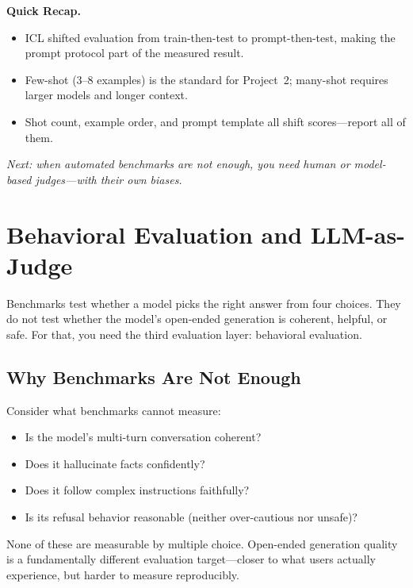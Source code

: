 \begin{quickrecap}
\textbf{Quick Recap.}
\begin{itemize}[nosep,leftmargin=1.5em]
  \item ICL shifted evaluation from train-then-test to prompt-then-test, making the prompt protocol part of the measured result.
  \item Few-shot (3--8 examples) is the standard for Project~2; many-shot requires larger models and longer context.
  \item Shot count, example order, and prompt template all shift scores---report all of them.
\end{itemize}
\textit{Next: when automated benchmarks are not enough, you need human or model-based judges---with their own biases.}
\end{quickrecap}


\section{Behavioral Evaluation and LLM-as-Judge}
\label{sec:behavioral-eval}

Benchmarks test whether a model picks the right answer from four choices. They do not test whether the model's open-ended generation is coherent, helpful, or safe. For that, you need the third evaluation layer: behavioral evaluation.

\subsection{Why Benchmarks Are Not Enough}

Consider what benchmarks cannot measure:
\begin{itemize}[nosep]
  \item Is the model's multi-turn conversation coherent?
  \item Does it hallucinate facts confidently?
  \item Does it follow complex instructions faithfully?
  \item Is its refusal behavior reasonable (neither over-cautious nor unsafe)?
\end{itemize}

None of these are measurable by multiple choice. Open-ended generation quality is a fundamentally different evaluation target---closer to what users actually experience, but harder to measure reproducibly.


